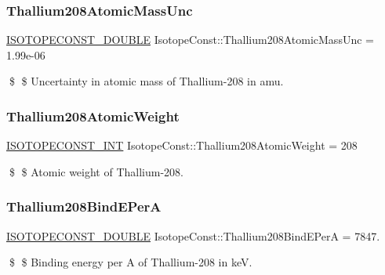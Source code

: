 \subsubsection{\texorpdfstring{Thallium208\+Atomic\+Mass\+Unc}{Thallium208AtomicMassUnc}}
{\footnotesize\ttfamily \mbox{\hyperlink{group___isotope_const-_macros_ga8f45a7272ce02c0b4c65c44636ed719a}{I\+S\+O\+T\+O\+P\+E\+C\+O\+N\+S\+T\+\_\+\+D\+O\+U\+B\+LE}} Isotope\+Const\+::\+Thallium208\+Atomic\+Mass\+Unc = 1.\+99e-\/06}

\$ \$ Uncertainty in atomic mass of Thallium-\/208 in amu. \mbox{\label{group___isotope_const-_thallium-_tl208_ga39074e1bb02f59335b3ee7892827556c}} 
\subsubsection{\texorpdfstring{Thallium208\+Atomic\+Weight}{Thallium208AtomicWeight}}
{\footnotesize\ttfamily \mbox{\hyperlink{group___isotope_const-_macros_ga5f18360b3e99483a35c32d789e62621c}{I\+S\+O\+T\+O\+P\+E\+C\+O\+N\+S\+T\+\_\+\+I\+NT}} Isotope\+Const\+::\+Thallium208\+Atomic\+Weight = 208}

\$ \$ Atomic weight of Thallium-\/208. \mbox{\label{group___isotope_const-_thallium-_tl208_ga2e69ccce4fe64ed089a852d31f639036}} 
\subsubsection{\texorpdfstring{Thallium208\+Bind\+E\+PerA}{Thallium208BindEPerA}}
{\footnotesize\ttfamily \mbox{\hyperlink{group___isotope_const-_macros_ga8f45a7272ce02c0b4c65c44636ed719a}{I\+S\+O\+T\+O\+P\+E\+C\+O\+N\+S\+T\+\_\+\+D\+O\+U\+B\+LE}} Isotope\+Const\+::\+Thallium208\+Bind\+E\+PerA = 7847.}

\$ \$ Binding energy per A of Thallium-\/208 in keV. \mbox{\label{group___isotope_const-_thallium-_tl208_gae603c2e2a579dae8811128ebc841c3d5}} 
